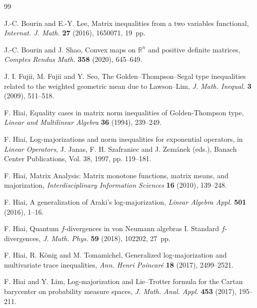 \documentclass[11pt,reqno]{article}
\numberwithin{equation}{section}
\def\bR{\mathbb{R}}
\begin{document}
\begin{thebibliography}{99}

J.-C. Bourin and E.-Y. Lee, Matrix inequalities from a two variables functional,
{\it Internat. J. Math.} {\bf 27} (2016), 1650071, 19~pp.

J.-C. Bourin and J. Shao, Convex maps on $\bR^n$ and positive definite matrices,
{\it Comptes Rendus Math.} {\bf 358} (2020), 645--649.


J. I. Fujii, M. Fujii and Y. Seo, The Golden--Thompson--Segal type inequalities related to the
weighted geometric mean due to Lawson--Lim, {\it J. Math. Inequal.} {\bf 3} (2009), 511--518.

F. Hiai, Equality cases in matrix norm inequalities of Golden-Thompson type,
{\it Linear and Multilinear Algebra} {\bf 36} (1994), 239--249.

F. Hiai, Log-majorizations and norm inequalities for exponential operators, in
{\it Linear Operators}, J. Janas, F. H. Szafraniec and J. Zem\'anek (eds.), Banach Center
Publications, Vol. 38, 1997, pp. 119--181.

F. Hiai, Matrix Analysis: Matrix monotone functions, matrix means, and majorization,
{\it Interdisciplinary Information Sciences} {\bf 16} (2010), 139--248.

F. Hiai, A generalization of Araki's log-majorization, {\it Linear Algebra Appl.} {\bf 501} (2016), 1--16.

F. Hiai, Quantum $f$-divergences in von Neumann algebras I. Standard $f$-divergences,
{\it J. Math. Phys.} {\bf 59} (2018), 102202, 27~pp.

F. Hiai, R. K\"onig and M. Tomamichel, Generalized log-majorization and multivariate trace inequalities,
{\it Ann. Henri Poincar\'e} {\bf 18} (2017), 2499--2521.

F. Hiai and Y. Lim, Log-majorization and Lie--Trotter formula for the Cartan barycenter on probability
measure spaces, {\it J. Math. Anal. Appl.} {\bf 453} (2017), 195--211.

%


\end{thebibliography}
\end{document}
